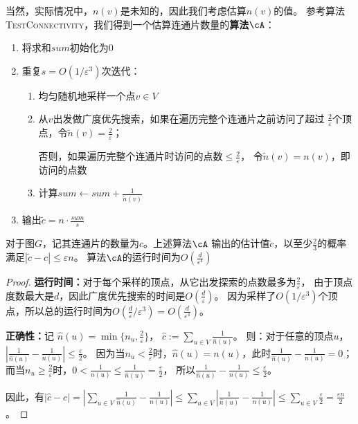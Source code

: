 \documentclass[lang=cn,newtx,10pt,scheme=chinese,chinesefont=nofont,citestyle=gb7714-2015, bibstyle=gb7714-2015]{elegantbook}
\begin{document}
\begin{refsection}
当然，实际情况中，$n(v)$是未知的，因此我们考虑估算$n(v)$的值。
参考算法\textsc{TestConnectivity}，我们得到一个估算连通片数量的\textbf{算法}$\cA$：
\begin{enumerate}
    \item 将求和$sum$初始化为0
    \item 重复$s=O(1/\varepsilon^3)$次迭代：
    \begin{enumerate}
        \item[2.1] 均匀随机地采样一个点$v\in V$
        \item[2.2] 从$v$出发做广度优先搜索，如果在遍历完整个连通片之前访问了超过
        $\frac{2}{\varepsilon}$个顶点，令$\tilde{n}(v)=\frac{2}{\varepsilon}$；
        
        否则，如果遍历完整个连通片时访问的点数$\le\frac{2}{\varepsilon}$，
        令$\tilde{n}(v)=n(v)$，即访问的点数
        \item[2.3] 计算$sum\leftarrow sum+\frac{1}{\tilde{n}(v)}$
    \end{enumerate}
    \item 输出$\tilde{c}=n\cdot\frac{sum}{s}$
\end{enumerate}

\begin{lemma}\label{lem:appncc}
    对于图$G$，记其连通片的数量为$c$。上述算法$\cA$
    输出的估计值$\tilde{c}$，以至少$\frac{2}{3}$的概率满足$|\tilde{c}-c|\le\varepsilon n$。
    算法$\cA$的运行时间为$O(\frac{d}{\varepsilon^4})$
\end{lemma}
\begin{proof}
    \textbf{运行时间：}对于每个采样的顶点，从它出发探索的点数最多为$\frac{2}{\varepsilon}$，
    由于顶点度数最大是$d$，因此广度优先搜索的时间是$O(\frac{d}{\varepsilon})$。
    因为采样了$O(1/\varepsilon^3)$个顶点，所以总的运行时间为$O(\frac{d}{\varepsilon}/\varepsilon^3)=O(\frac{d}{\varepsilon^4})$。

    \textbf{正确性：}记
    $\hat{n}(u)=\min\{n_u,\frac{2}{\varepsilon}\}$，
    $\hat{c}:=\sum_{u\in V}\frac{1}{\hat{n}(u)}$。
    则：对于任意的顶点$u$，$|\frac{1}{\hat{n}(u)}-\frac{1}{n(u)}|\le\frac{\varepsilon}{2}$。
    因为当$n_u<\frac{2}{\varepsilon}$时，$\hat{n}(u)=n(u)$，此时$\frac{1}{\hat{n}(u)}-\frac{1}{{n}(u)}=0$；
    而当$n_u\ge\frac{2}{\varepsilon}$时，$0<\frac{1}{{n}(u)}\le\frac{1}{\hat{n}(u)}=\frac{\varepsilon}{2}$，
    所以$\frac{1}{\hat{n}(u)}-\frac{1}{{n}(u)}\le\frac{\varepsilon}{2}$。

    因此，有$|\hat{c}-c|=|\sum_{u\in V}\frac{1}{\hat{n}(u)}-\frac{1}{n(u)}|\le\sum_{u\in V}|\frac{1}{\hat{n}(u)}-\frac{1}{{n}(u)}|
    \le\sum_{u\in V}\frac{\varepsilon}{2}=\frac{\varepsilon n}{2}$。


\end{proof}
\end{refsection}
\end{document}
